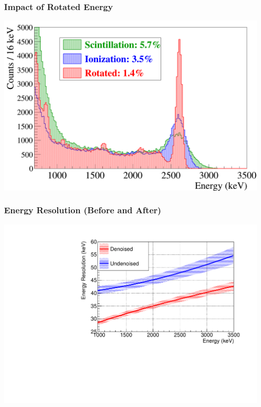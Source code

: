 \documentclass{beamer}
\begin{document}
\begin{frame}
\begin{center}
\frametitle{Impact of Rotated Energy}
\end{center}
\begin{center}
\includegraphics[keepaspectratio=true,width=\textwidth]{RotationTh2D_ImprovementInResolution.png}
\end{center}
\end{frame}

\begin{frame}
\begin{center}
\frametitle{Energy Resolution (Before and After)}
\end{center}
\vspace{0.5cm}
\begin{center}
\includegraphics[keepaspectratio=true,width=\textwidth,clip=true,trim=0mm 0mm 10mm 10mm]{ResolutionFunctionComparison_absolute.pdf}
\end{center}
\end{frame}
\end{document}
